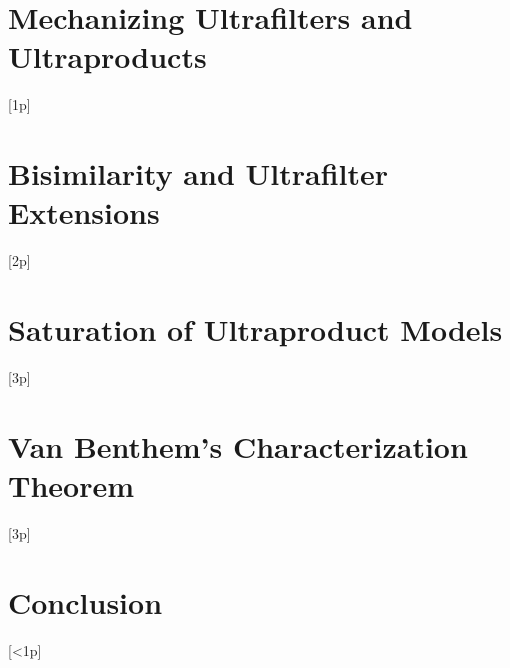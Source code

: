 \documentclass{llncs}
\begin{document}
\section{Mechanizing Ultrafilters and Ultraproducts}[1p]


\section{Bisimilarity and Ultrafilter Extensions}[2p]

\section{Saturation of Ultraproduct Models}[3p]

\section{Van Benthem's Characterization Theorem}[3p]

\section{Conclusion}[<1p]



\end{document}
